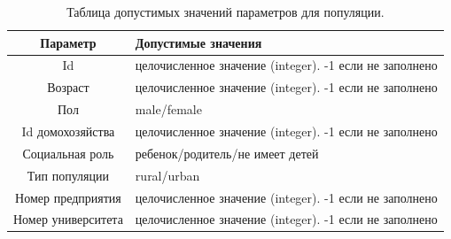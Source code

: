 \documentclass[14pt,a4paper]{article}
\begin{document}
\begin{table}[h]
	\centering
	\begin{tabularx}{\textwidth}{|c|X|}
		\hline
		Параметр               & Допустимые значения                                         \\
		\hline
		Id                     & целочисленное значение (integer). -1 если не заполнено      \\
		Возраст                & целочисленное значение (integer). -1 если не заполнено      \\
		Пол                    & male/female                                                 \\
		Id домохозяйства       & целочисленное значение (integer). -1 если не заполнено      \\
		Социальная роль        & ребенок/родитель/не имеет детей                             \\
		Тип популяции          & rural/urban                                                 \\
		Номер предприятия      & целочисленное значение (integer). -1 если не заполнено      \\
		Номер университета     & целочисленное значение (integer). -1 если не заполнено      \\
		\hline
	\end{tabularx}
	\caption{Таблица допустимых значений параметров для популяции.}
	\label{fig:table_paremeters_population}
\end{table}


\end{document}
